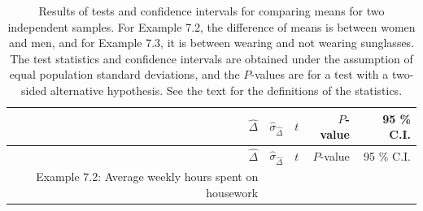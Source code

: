 \documentclass[11pt,a4paper,openany]{book}
\begin{document}
\begin{longtable}[]{@{}rrrrr@{}}
\caption{\label{tab:t-2testsY1} Results of tests and confidence intervals
for comparing means for two independent samples. For Example 7.2, the
difference of means is between women and men, and for Example 7.3, it is
between wearing and not wearing sunglasses. The test statistics and
confidence intervals are obtained under the assumption of equal
population standard deviations, and the \(P\)-values are for a test with
a two-sided alternative hypothesis. See the text for the definitions of
the statistics.}\tabularnewline
\toprule
\begin{minipage}[b]{0.28\columnwidth}\raggedleft\strut
\(\hat{\Delta}\)\strut
\end{minipage} & \begin{minipage}[b]{0.25\columnwidth}\raggedleft\strut
\(\hat{\sigma}_{\hat{\Delta}}\)\strut
\end{minipage} & \begin{minipage}[b]{0.08\columnwidth}\raggedleft\strut
\(t\)\strut
\end{minipage} & \begin{minipage}[b]{0.09\columnwidth}\raggedleft\strut
\(P\)-value\strut
\end{minipage} & \begin{minipage}[b]{0.14\columnwidth}\raggedleft\strut
95 \% C.I.\strut
\end{minipage}\tabularnewline
\midrule
\endfirsthead
\toprule
\begin{minipage}[b]{0.28\columnwidth}\raggedleft\strut
\(\hat{\Delta}\)\strut
\end{minipage} & \begin{minipage}[b]{0.25\columnwidth}\raggedleft\strut
\(\hat{\sigma}_{\hat{\Delta}}\)\strut
\end{minipage} & \begin{minipage}[b]{0.08\columnwidth}\raggedleft\strut
\(t\)\strut
\end{minipage} & \begin{minipage}[b]{0.09\columnwidth}\raggedleft\strut
\(P\)-value\strut
\end{minipage} & \begin{minipage}[b]{0.14\columnwidth}\raggedleft\strut
95 \% C.I.\strut
\end{minipage}\tabularnewline
\midrule
\endhead
\begin{minipage}[t]{0.28\columnwidth}\raggedleft\strut
Example 7.2: Average weekly hours spent on housework\strut
\end{minipage} & \begin{minipage}[t]{0.25\columnwidth}\raggedleft\strut

\end{minipage}
\end{longtable}
\end{document}
